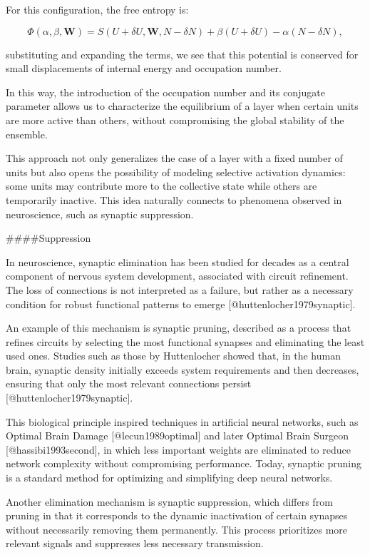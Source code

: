 \documentclass[12pt]{article}
\begin{document}
For this configuration, the free entropy is:

\begin{equation}
\Phi(\alpha, \beta, \mathbf{W}) = S(U+\delta U, \mathbf{W}, N- \delta N) + \beta(U + \delta U) - \alpha (N-\delta N),
\end{equation}

substituting and expanding the terms, we see that this potential is conserved for small displacements of internal energy and occupation number.

In this way, the introduction of the occupation number and its conjugate parameter allows us to characterize the equilibrium of a layer when certain units are more active than others, without compromising the global stability of the ensemble.

This approach not only generalizes the case of a layer with a fixed number of units but also opens the possibility of modeling selective activation dynamics: some units may contribute more to the collective state while others are temporarily inactive. This idea naturally connects to phenomena observed in neuroscience, such as synaptic suppression.

####Suppression

In neuroscience, synaptic elimination has been studied for decades as a central component of nervous system development, associated with circuit refinement. The loss of connections is not interpreted as a failure, but rather as a necessary condition for robust functional patterns to emerge [@huttenlocher1979synaptic].

An example of this mechanism is synaptic pruning, described as a process that refines circuits by selecting the most functional synapses and eliminating the least used ones. Studies such as those by Huttenlocher showed that, in the human brain, synaptic density initially exceeds system requirements and then decreases, ensuring that only the most relevant connections persist [@huttenlocher1979synaptic].

This biological principle inspired techniques in artificial neural networks, such as Optimal Brain Damage [@lecun1989optimal] and later Optimal Brain Surgeon [@hassibi1993second], in which less important weights are eliminated to reduce network complexity without compromising performance. Today, synaptic pruning is a standard method for optimizing and simplifying deep neural networks.

Another elimination mechanism is synaptic suppression, which differs from pruning in that it corresponds to the dynamic inactivation of certain synapses without necessarily removing them permanently. This process prioritizes more relevant signals and suppresses less necessary transmission.
\end{document}
